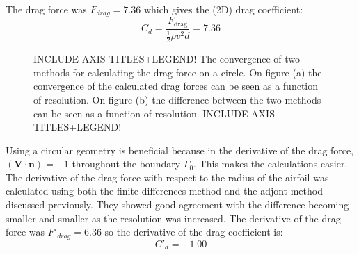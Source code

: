 \documentclass[12pt, a4paper]{article}
\begin{document}
The drag force was $F_{drag} = 7.36$ which gives the (2D) drag coefficient:
\begin{equation}
C_d = \frac{F_{\text{drag}}}{\frac{1}{2} \rho v^2 d} = 7.36
\end{equation}
\begin{figure}[hbtp]
    \centering
    \qquad
    \caption{INCLUDE AXIS TITLES+LEGEND! The convergence of two methods for calculating the drag force on a circle. On figure (a) the convergence of the calculated drag forces can be seen as a function of resolution. On figure (b) the difference between the two methods can be seen as a function of resolution. INCLUDE AXIS TITLES+LEGEND!}
    \label{fig:circle_convergence}
\end{figure}

Using a circular geometry is beneficial because in the derivative of the drag force, $(\mathbf{V \cdot n}) = -1$ throughout the boundary $\Gamma_0$. This makes the calculations easier. The derivative of the drag force with respect to the radius of the airfoil was calculated using both the finite differences method and the adjont method discussed previously. They showed good agreement with the difference becoming smaller and smaller as the resolution was increased. The derivative of the drag force was $F'_{drag} = 6.36$ so the derivative of the drag coefficient is:
\begin{equation}
C'_d = -1.00
\end{equation}
\end{document}
